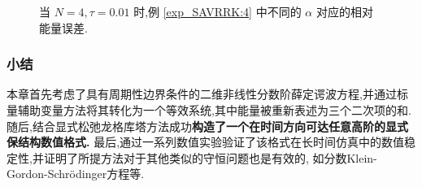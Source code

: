 \documentclass[aspectratio=169]{beamer}
\numberwithin{theorem}{section} %
\begin{document}
\begin{frame}%
	\begin{figure}[H]
		\begin{center}
		\caption{当 $N=4, \tau=0.01$ 时,例 \ref{exp_SAVRRK:4} 中不同的 $\alpha$ 对应的相对能量误差.}
		\label{fig_SAVRRK:3-5}
		\end{center}
		\end{figure}
\end{frame}

\begin{frame}\frametitle{小结}
	本章首先考虑了具有周期性边界条件的二维非线性分数阶薛定谔波方程,并通过标量辅助变量方法将其转化为一个等效系统,其中能量被重新表述为三个二次项的和.
	随后,结合显式松弛龙格库塔方法成功\textbf{\textcolor[rgb]{0.227,0.373,0.306}{构造了一个在时间方向可达任意高阶的显式保结构数值格式.}}
	最后,通过一系列数值实验验证了该格式在长时间仿真中的数值稳定性,并证明了所提方法对于其他类似的守恒问题也是有效的,
	如分数Klein-Gordon-Schr{\"o}dinger方程等.	
\end{frame}
\end{document}
